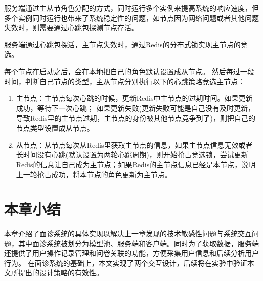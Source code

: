 服务端通过主从节角色分配的方式，同时运行多个实例来提高系统的响应速度，但多个实例同时运行也带来了系统稳定性的问题，如节点因为网络问题或者其他问题失效时，则需要通过心跳包探测节点存活。

服务端通过心跳包探活，主节点失效时，通过Redis的分布式锁实现主节点的竞选。

每个节点在启动之后，会在本地把自己的角色默认设置成从节点。
然后每过一段时间，判断自己节点的类型，主从节点分别执行以下的心跳策略竞选主节点：

\begin{enumerate}
    \item 主节点：主节点每次心跳的时候，更新Redis中主节点的过期时间。如果更新成功，等待下一次心跳； 如果更新失败(更新失败可能是自己没有及时更新，导致Redis里的主节点过期，主节点的身份被其他节点竞争到了)，则把自己的节点类型设置成从节点。
    
    \item 从节点：从节点每次从Redis里获取主节点的信息，如果主节点信息无效或者长时间没有心跳(默认设置为两轮心跳周期)，则开始抢占竞选锁，尝试更新Redis的信息让自己成为主节点；如果Redis的主节点信息已经是本节点，说明上一轮抢占成功，将本节点的角色更新为主节点。 
\end{enumerate}


\section{本章小结}
本章介绍了面诊系统的具体实现以解决上一章发现的技术敏感性问题与系统交互问题，其中面诊系统被划分为模型池、服务端和客户端。同时为了获取数据，服务端还提供了用户操作记录管理和问卷关联的功能，方便采集用户信息和后续分析用户行为。
在面诊系统的基础上，本文实现了两个交互设计，后续将在实验中验证本文所提出的设计策略的有效性。